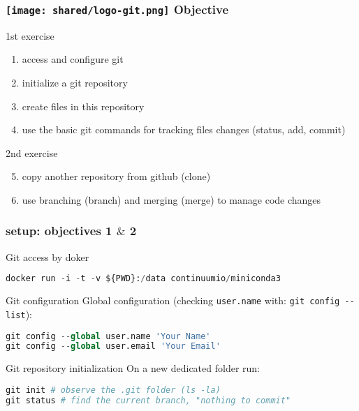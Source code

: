 \begin{frame}[containsverbatim]
\frametitle{\texttt{[image: shared/logo-git.png]} Objective}
\begin{exampleblock}{1st exercise}
\begin{enumerate}
    \item access and configure git
    \item initialize a git repository
    \item create files in this repository
    \item use the basic git commands for tracking files changes (status, add, commit)
\end{enumerate}
\end{exampleblock}
\begin{exampleblock}{2nd exercise}
\begin{enumerate}
\setcounter{enumi}{4}
    \item copy another repository from github (clone)
    \item use branching (branch) and merging (merge) to manage code changes
\end{enumerate}
\end{exampleblock}
\end{frame}
\begin{frame}[containsverbatim]
\frametitle{  setup: objectives 1 $\&$ 2}
\begin{exampleblock}{Git access by doker}
\begin{lstlisting}[language=python]
docker run -i -t -v ${PWD}:/data continuumio/miniconda3
\end{lstlisting}
\end{exampleblock}
\begin{exampleblock}{Git configuration}
Global configuration (checking \verb|user.name| with: \verb|git config --list|):
\begin{lstlisting}[language=python]
git config --global user.name 'Your Name'
git config --global user.email 'Your Email'
\end{lstlisting}
\end{exampleblock}
\begin{exampleblock}{Git repository initialization}
On a new dedicated folder run: 
\begin{lstlisting}[language=python]
git init # observe the .git folder (ls -la)
git status # find the current branch, "nothing to commit"
\end{lstlisting}
\end{exampleblock}
\end{frame}
